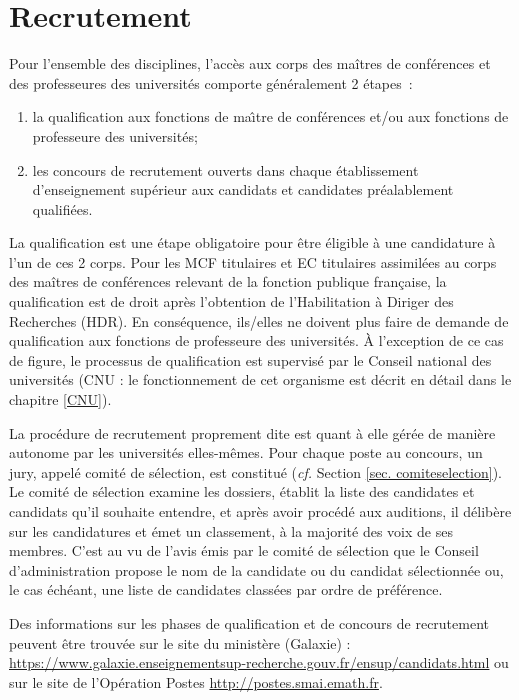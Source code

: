 \section{Recrutement}
\label{recrutement}

Pour l'ensemble des disciplines, l'acc\`es aux corps
des ma\^itres de conf\'erences et des professeur\mp e\mp s des universit\'es comporte
g\'en\'eralement 2 \'etapes~:
\begin{enumerate}
\item la qualification aux fonctions
de ma\^\i tre de conf\'erences et/ou aux fonctions de professeur\mp e des
universit\'es;
\item les concours de recrutement ouverts dans chaque \'etablissement
d'enseignement sup\'erieur aux candidats et candidates pr\'ealablement
qualifi\'e\mp e\mp s.
\end{enumerate}

La qualification est une \'etape obligatoire pour \^etre \'eligible \`a une candidature \`a l'un de ces 2 corps. Pour les MCF titulaires et EC titulaires assimil\'e\mp e\mp s au corps des ma\^itres de conf\'erences relevant de la fonction publique française, la qualification est de droit apr\`es l'obtention de l'Habilitation \`a Diriger des Recherches (HDR). En cons\'equence, ils/elles ne doivent plus faire de demande de qualification aux fonctions de professeur\mp e des universit\'es. \`A l'exception de ce cas de figure, le processus de qualification est supervis\'e par le Conseil national des universit\'es (CNU : le fonctionnement de cet organisme est d\'ecrit en d\'etail dans le chapitre \ref{CNU}). 


La proc\'edure de recrutement proprement dite est quant \`a elle g\'er\'ee de mani\`ere autonome par les universit\'es elles-m\^emes. Pour chaque poste au concours, un jury, appel\'e comit\'e de s\'election, est constitu\'e ({\em cf.} Section \ref{sec. comiteselection}). Le comit\'e de s\'election examine les dossiers, \'etablit la liste des candidates et candidats qu'il souhaite entendre, et apr\`es avoir proc\'ed\'e aux auditions, il d\'elib\`ere sur les candidatures et \'emet un classement, \`a la majorit\'e des voix de ses membres. C'est au vu de l'avis \'emis par le comit\'e de s\'election que le Conseil d'administration propose le nom de la candidate ou du candidat s\'electionn\'e\mp e ou, le cas \'ech\'eant, une liste de candidat\mp e\mp s class\'e\mp e\mp s par ordre de pr\'ef\'erence.

Des informations sur les phases de qualification et de concours de recrutement peuvent \^etre trouv\'ee sur le site du minist\`ere (Galaxie) : \url{https://www.galaxie.enseignementsup-recherche.gouv.fr/ensup/candidats.html} ou sur le site de l'Op\'eration Postes \url{http://postes.smai.emath.fr}.



